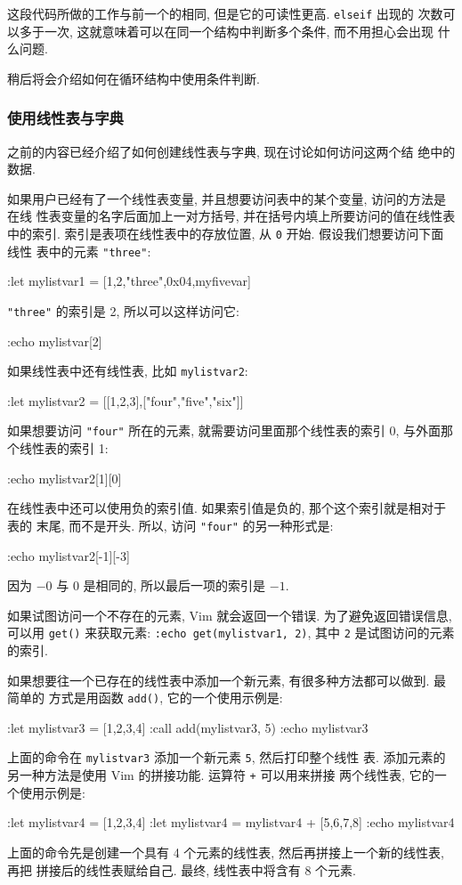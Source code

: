 这段代码所做的工作与前一个的相同, 但是它的可读性更高. \texttt{elseif} 出现的
次数可以多于一次, 这就意味着可以在同一个结构中判断多个条件, 而不用担心会出现
什么问题.

稍后将会介绍如何在循环结构中使用条件判断.

\subsubsection{使用线性表与字典}
\label{subsubsec:working_with_lists_and_dictionaries}

之前的内容已经介绍了如何创建线性表与字典, 现在讨论如何访问这两个结
绝中的数据.

如果用户已经有了一个线性表变量, 并且想要访问表中的某个变量, 访问的方法是在线
性表变量的名字后面加上一对方括号, 并在括号内填上所要访问的值在线性表中的索引.
索引是表项在线性表中的存放位置, 从 \texttt{0} 开始. 假设我们想要访问下面线性
表中的元素 \texttt{"three"}:
\begin{vimcode}
:let mylistvar1 = [1,2,"three",0x04,myfivevar]
\end{vimcode}
\texttt{"three"} 的索引是 2, 所以可以这样访问它:
\begin{vimcode}
:echo mylistvar[2]
\end{vimcode}
如果线性表中还有线性表, 比如 \texttt{mylistvar2}:
\begin{vimcode}
:let mylistvar2 = [[1,2,3],["four","five","six"]]
\end{vimcode}
如果想要访问 \texttt{"four"} 所在的元素, 就需要访问里面那个线性表的索引 0,
与外面那个线性表的索引 1:
\begin{vimcode}
:echo mylistvar2[1][0]
\end{vimcode}

在线性表中还可以使用负的索引值. 如果索引值是负的, 那个这个索引就是相对于表的
末尾, 而不是开头. 所以, 访问 \texttt{"four"} 的另一种形式是:
\begin{vimcode}
:echo mylistvar2[-1][-3]
\end{vimcode}
因为 $-0$ 与 $0$ 是相同的, 所以最后一项的索引是 $-1$.

\begin{warning}
    如果试图访问一个不存在的元素, Vim 就会返回一个错误. 为了避免返回错误信息,
    可以用 \texttt{get()} 来获取元素: \texttt{:echo get(mylistvar1, 2)}, 其中
    \texttt{2} 是试图访问的元素的索引.
\end{warning}

如果想要往一个已存在的线性表中添加一个新元素, 有很多种方法都可以做到. 最简单的
方式是用函数 \texttt{add()}, 它的一个使用示例是:
\begin{vimcode}
:let mylistvar3 = [1,2,3,4]
:call add(mylistvar3, 5)
:echo mylistvar3
\end{vimcode}
上面的命令在 \texttt{mylistvar3} 添加一个新元素 \texttt{5}, 然后打印整个线性
表. 添加元素的另一种方法是使用 Vim 的拼接功能. 运算符 \texttt{+} 可以用来拼接
两个线性表, 它的一个使用示例是:
\begin{vimcode}
:let mylistvar4 = [1,2,3,4]
:let mylistvar4 = mylistvar4 + [5,6,7,8]
:echo mylistvar4
\end{vimcode}
上面的命令先是创建一个具有 4 个元素的线性表, 然后再拼接上一个新的线性表, 再把
拼接后的线性表赋给自己. 最终, 线性表中将含有 8 个元素.

